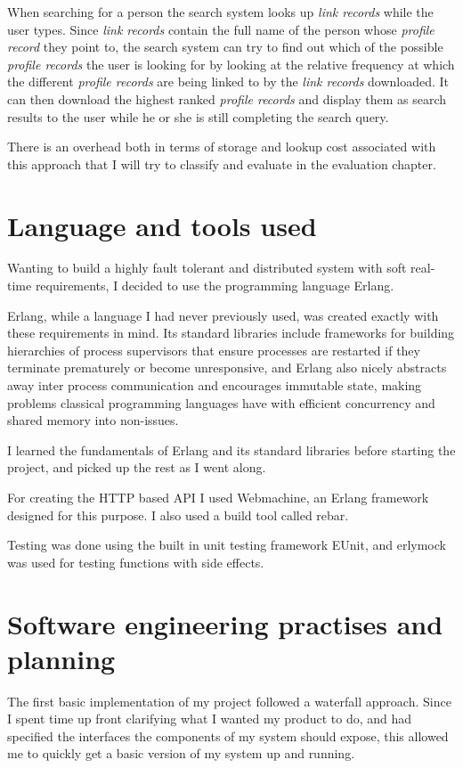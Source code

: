 When searching for a person the search system looks up \emph{link records} while the user types. Since \emph{link records} contain the full name of the person whose \emph{profile record} they point to, the search system can try to find out which of the possible \emph{profile records} the user is looking for by looking at the relative frequency at which the different \emph{profile records} are being linked to by the \emph{link records} downloaded. It can then download the highest ranked \emph{profile records} and display them as search results to the user while he or she is still completing the search query.

There is an overhead both in terms of storage and lookup cost associated with this approach that I will try to classify and evaluate in the evaluation chapter.

\section{Language and tools used}
Wanting to build a highly fault tolerant and distributed system with soft real-time requirements, I decided to use the programming language Erlang.

Erlang, while a language I had never previously used, was created exactly with these requirements in mind. Its standard libraries include frameworks for building hierarchies of process supervisors that ensure processes are restarted if they terminate prematurely or become unresponsive, and Erlang also nicely abstracts away inter process communication and encourages immutable state, making problems classical programming languages have with efficient concurrency and shared memory into non-issues.

I learned the fundamentals of Erlang and its standard libraries before starting the project, and picked up the rest as I went along.

For creating the HTTP based API I used Webmachine, an Erlang framework designed for this purpose. I also used a build tool called rebar.

Testing was done using the built in unit testing framework EUnit, and erlymock was used for testing functions with side effects.

\section{Software engineering practises and planning}
The first basic implementation of my project followed a waterfall approach. Since I spent time up front clarifying  what I wanted my product to do, and had specified the interfaces the components of my system should expose, this allowed me to quickly get a basic version of my system up and running.

